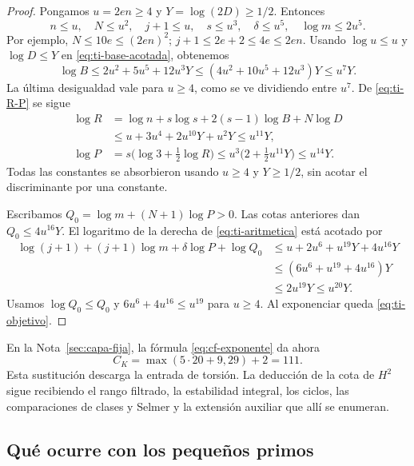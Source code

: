 \begin{proof}
Pongamos $u=2en\ge4$ y $Y=\log(2D)\ge1/2$.
Entonces
\begin{equation}
 n\le u,\quad N\le u^2,\quad j+1\le u,\quad
 s\le u^3,\quad \delta\le u^5,\quad \log m\le2u^5.
 \label{eq:ti-parametros}
\end{equation}
Por ejemplo, $N\le10e\le(2en)^2$;
$j+1\le2e+2\le4e\le2en$.
Usando $\log u\le u$ y $\log D\le Y$ en
\eqref{eq:ti-base-acotada}, obtenemos
\[
 \log B
 \le2u^2+5u^5+12u^3Y
 \le(4u^2+10u^5+12u^3)Y
 \le u^7Y.
\]
La última desigualdad vale para $u\ge4$, como se ve
dividiendo entre $u^7$. De \eqref{eq:ti-R-P} se sigue
\[
 \begin{aligned}
 \log R
 &=\log n+s\log s+2(s-1)\log B+N\log D\\
 &\le u+3u^4+2u^{10}Y+u^2Y
 \le u^{11}Y,\\
 \log P
 &=s\bigl(\log3+\tfrac12\log R\bigr)
 \le u^3\bigl(2+\tfrac12u^{11}Y\bigr)
 \le u^{14}Y.
 \end{aligned}
\]
Todas las constantes se absorbieron usando $u\ge4$ y
$Y\ge1/2$, sin acotar el discriminante por una constante.

Escribamos $Q_0=\log m+(N+1)\log P>0$.
Las cotas anteriores dan $Q_0\le4u^{16}Y$.
El logaritmo de la derecha de \eqref{eq:ti-aritmetica}
está acotado por
\[
 \begin{aligned}
 \log(j+1)+(j+1)\log m+\delta\log P+\log Q_0
 &\le u+2u^6+u^{19}Y+4u^{16}Y\\
 &\le(6u^6+u^{19}+4u^{16})Y\\
 &\le2u^{19}Y\le u^{20}Y.
 \end{aligned}
\]
Usamos $\log Q_0\le Q_0$ y
$6u^6+4u^{16}\le u^{19}$ para $u\ge4$.
Al exponenciar queda \eqref{eq:ti-objetivo}.
\end{proof}

En la Nota~\ref{sec:capa-fija}, la fórmula
\eqref{eq:cf-exponente} da ahora
\begin{equation}
 C_K=\max(5\cdot20+9,29)+2=111.
 \label{eq:ti-CK}
\end{equation}
Esta sustitución descarga la entrada de torsión.
La deducción de la cota de $H^2$ sigue recibiendo el rango
filtrado, la estabilidad integral, los ciclos, las comparaciones
de clases y Selmer y la extensión auxiliar que allí se enumeran.

\subsection{Qué ocurre con los pequeños primos}

